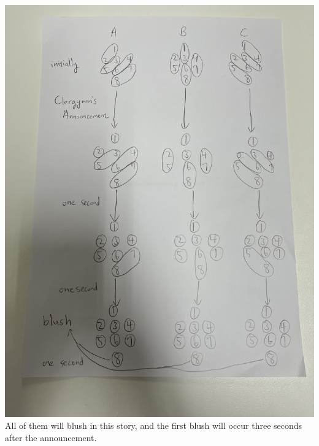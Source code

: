 \begin{pr}[12.12.14]$ $\\
\includegraphics[width=15cm,angle=270]{p5.JPG}\\
All of them will blush in this story, and the first blush will occur three seconds after the announcement.
\end{pr}
